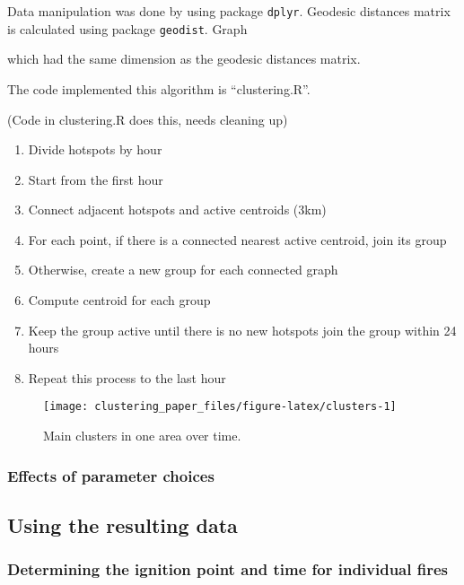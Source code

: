 Data manipulation was done by using package \texttt{dplyr}. Geodesic
distances matrix is calculated using package \texttt{geodist}. Graph

which had the same dimension as the geodesic distances matrix.

The code implemented this algorithm is ``clustering.R''.

(Code in clustering.R does this, needs cleaning up)

\begin{enumerate}
\def\labelenumi{\arabic{enumi}.}
\tightlist
\item
  Divide hotspots by hour
\item
  Start from the first hour
\item
  Connect adjacent hotspots and active centroids (3km)
\item
  For each point, if there is a connected nearest active centroid, join
  its group
\item
  Otherwise, create a new group for each connected graph
\item
  Compute centroid for each group
\item
  Keep the group active until there is no new hotspots join the group
  within 24 hours
\item
  Repeat this process to the last hour
\end{enumerate}

\begin{Schunk}
\begin{figure}
\texttt{[image: clustering\_paper\_files/figure-latex/clusters-1]} \caption[Main clusters in one area over time]{Main clusters in one area over time.}\label{fig:clusters}
\end{figure}
\end{Schunk}

\hypertarget{effects-of-parameter-choices}{%
\subsubsection{Effects of parameter
choices}\label{effects-of-parameter-choices}}

\hypertarget{using-the-resulting-data}{%
\subsection{Using the resulting data}\label{using-the-resulting-data}}

\hypertarget{determining-the-ignition-point-and-time-for-individual-fires}{%
\subsubsection{Determining the ignition point and time for individual
fires}\label{determining-the-ignition-point-and-time-for-individual-fires}}

